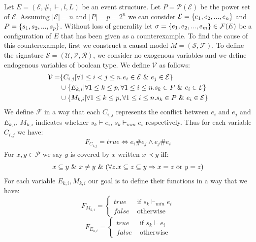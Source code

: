 \documentclass{article}
\begin{document}
Let $E = (\mathcal{E},\#,\vdash,l,L)$ be an event structure.
Let $P = \mathcal{P}(\mathcal{E})$ be the power set of $\mathcal{E}$.
Assuming $|\mathcal{E}| = n$ and $|P| = p = 2^n$ we can consider
$\mathcal{E} = \{e_1, e_2, ...,e_n\}$ and $P = \{s_1,s_2,...,s_p\}$.
Without loss of generality let $\sigma = \{e_1,e_2,...,e_m\} \in \mathcal{F}(E)$ be a configuration of $E$ that
has been given as a counterexample.
To find the cause of this counterexample, first we construct a causal model $M = (\mathcal{S},\mathcal{F})$.
To define the signature $\mathcal{S} = (\mathcal{U},\mathcal{V},\mathcal{R})$, we consider no exogenous variables and we
define endogenous variables of boolean type.
We define $\mathcal{V}$ as follows:
\begin{align*}
    \mathcal{V} = & \{C_{i,j} | \forall 1 \leq i < j \leq n. e_i \in \mathcal{E} \ \& \  e_j \in \mathcal{E}\}                    \\
    & \cup \{E_{k,i} | \forall 1 \leq k \leq p , \forall 1 \leq i \leq n . s_k \in P \ \& \  e_i \in \mathcal{E} \} \\
    & \cup \{M_{k,i} | \forall 1 \leq k \leq p , \forall 1 \leq i \leq n . s_k \in P \ \& \  e_i \in \mathcal{E} \} \\
\end{align*}
We define $\mathcal{F}$ in a way that each $C_{i,j}$ represents the conflict
between $e_i$ and $e_j$ and $E_{k,i}$, $M_{k,i}$ indicates whether $s_k \vdash e_i$, $s_k \vdash_{min} e_i$ respectively.
Thus for each variable $C_{i,j}$ we have:
\begin{align*}
    F_{C_{i,j}}  = true \iff e_i \# e_j \wedge e_j \# e_i
\end{align*}
For $x,y \in \mathcal{P}$ we say $y$ is covered by $x$ written $ x \prec y$ iff:
\begin{align*}
    x \subseteq y \ \& \  x \neq y \ \& \ 
    (\forall z. x \subseteq z \subseteq y \Rightarrow x = z
    \text{ or } y = z)
\end{align*}
For each variable $E_{k,i},M_{k,i}$ our goal is to define their
functions in a way that we have:
$$
    F_{M_{k,i}}  =  \begin{cases}
        true & \text{ if } s_k \vdash_{min} e_i \\
        false & \text{ otherwise}
    \end{cases}
$$
$$
    F_{E_{k,i}}  =  \begin{cases}
        true & \text{ if } s_k \vdash e_i \\
        false & \text{ otherwise}
    \end{cases}
$$
\end{document}
